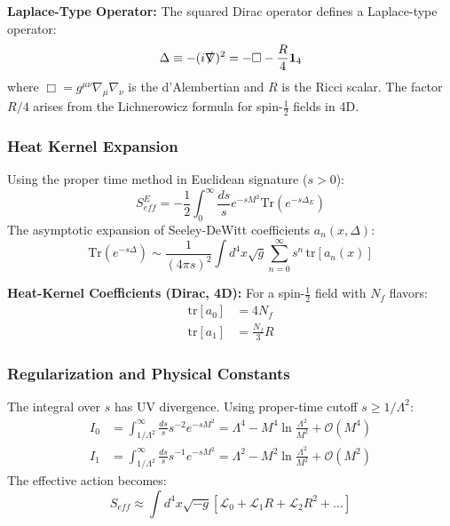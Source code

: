 \documentclass[a4paper,12pt]{article}
\begin{document}
\textbf{Laplace-Type Operator:}
The squared Dirac operator defines a Laplace-type operator:
\begin{equation}
    \Delta \equiv -(i\slashed{\nabla})^2 = -\Box - \frac{R}{4} \mathbf{1}_4
\end{equation}
where $\Box = g^{\mu\nu}\nabla_\mu\nabla_\nu$ is the d'Alembertian and $R$ is the Ricci scalar. The factor $R/4$ arises from the Lichnerowicz formula for spin-$\frac{1}{2}$ fields in 4D.

\subsubsection{Heat Kernel Expansion}
Using the proper time method in Euclidean signature ($s > 0$):
\begin{equation}
 S_{eff}^E = -\frac{1}{2} \int_0^\infty \frac{ds}{s} e^{-sM^2} \text{Tr} (e^{-s\Delta_E})
\end{equation}
The asymptotic expansion of Seeley-DeWitt coefficients $a_n(x, \Delta)$:
\begin{equation}
 \text{Tr} (e^{-s\Delta}) \sim \frac{1}{(4\pi s)^2} \int d^4x \sqrt{g} \sum_{n=0}^{\infty} s^n \, \text{tr}[a_n(x)]
\end{equation}

\textbf{Heat-Kernel Coefficients (Dirac, 4D):}
For a spin-$\frac{1}{2}$ field with $N_f$ flavors:
\begin{align}
    \text{tr}[a_0] &= 4 N_f \\
    \text{tr}[a_1] &= \frac{N_f}{3} R
\end{align}

\subsubsection{Regularization and Physical Constants}
The integral over $s$ has UV divergence. Using proper-time cutoff $s \geq 1/\Lambda^2$:
\begin{align}
    I_0 &= \int_{1/\Lambda^2}^\infty \frac{ds}{s} s^{-2} e^{-sM^2} = \Lambda^4 - M^4 \ln\frac{\Lambda^2}{M^2} + \mathcal{O}(M^4) \\
    I_1 &= \int_{1/\Lambda^2}^\infty \frac{ds}{s} s^{-1} e^{-sM^2} = \Lambda^2 - M^2 \ln\frac{\Lambda^2}{M^2} + \mathcal{O}(M^2)
\end{align}
The effective action becomes:
\begin{equation}
 S_{eff} \approx \int d^4x \sqrt{-g} \left[ \mathcal{L}_0 + \mathcal{L}_1 R + \mathcal{L}_2 R^2 + \dots \right]
\end{equation}
\end{document}
